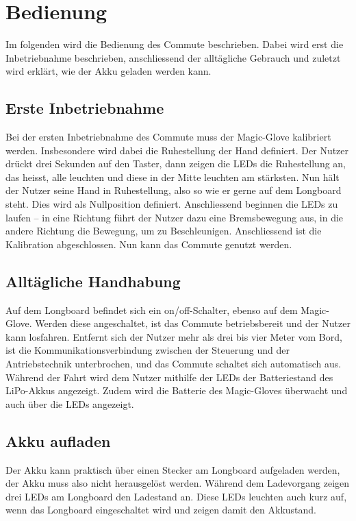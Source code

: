 \section{Bedienung}
Im folgenden wird die Bedienung des Commute beschrieben. Dabei wird erst die Inbetriebnahme beschrieben, anschliessend der alltägliche Gebrauch und zuletzt wird erklärt, wie der Akku geladen werden kann.
\subsection*{Erste Inbetriebnahme}
Bei der ersten Inbetriebnahme des Commute muss der Magic-Glove kalibriert werden. Insbesondere wird dabei die Ruhestellung der Hand definiert. Der Nutzer drückt drei Sekunden auf den Taster, dann zeigen die LEDs die Ruhestellung an, das heisst, alle leuchten und diese in der Mitte leuchten am stärksten. Nun hält der Nutzer seine Hand in Ruhestellung, also so wie er gerne auf dem Longboard steht. Dies wird als Nullposition definiert. Anschliessend beginnen die LEDs zu laufen – in eine Richtung führt der Nutzer dazu eine Bremsbewegung aus, in die andere Richtung die Bewegung, um zu Beschleunigen. Anschliessend ist die Kalibration abgeschlossen. Nun kann das Commute genutzt werden.
\subsection*{Alltägliche Handhabung}
Auf dem Longboard befindet sich ein on/off-Schalter, ebenso auf dem Magic-Glove. Werden diese angeschaltet, ist das Commute betriebsbereit und der Nutzer kann losfahren. 
Entfernt sich der Nutzer mehr als drei bis vier Meter vom Bord, ist die Kommunikationsverbindung zwischen der Steuerung und der Antriebstechnik unterbrochen, und das Commute schaltet sich automatisch aus. Während der Fahrt wird dem Nutzer mithilfe der LEDs der Batteriestand des LiPo-Akkus angezeigt. Zudem wird die Batterie des Magic-Gloves überwacht und auch über die LEDs angezeigt. 
\subsection*{Akku aufladen}
Der Akku kann praktisch über einen Stecker am Longboard aufgeladen werden, der Akku muss also nicht herausgelöst werden. Während dem Ladevorgang zeigen drei LEDs am Longboard den Ladestand an. Diese LEDs leuchten auch kurz auf, wenn das Longboard eingeschaltet wird und zeigen damit den Akkustand. 


